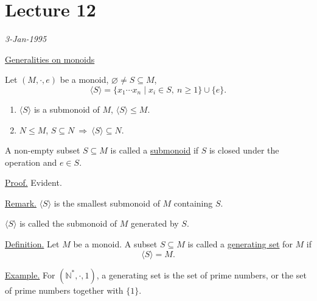 
\clearpage
\section{Lecture 12}

\begin{center}
\end{center}
\begin{flushright}
\textit{3-Jan-1995}
\end{flushright}

\medskip
\noindent\underline{Generalities on monoids}

\bigskip
\noindent{}\quad Let $(M,\cdot,e)$ be a monoid, $\varnothing\neq S\subseteq M$,
\[
\langle S\rangle
=\{x_1\cdots x_n\mid x_i\in S,\ n\geq 1\}\cup\{e\}.
\]
\noindent
\begin{enumerate}
\item[(1)] $\langle S\rangle$ is a submonoid of $M$, $\langle S\rangle\leq M$.
\item[(2)] $N\leq M$, $S\subseteq N\ \Longrightarrow\ \langle S\rangle\subseteq N$.
\end{enumerate}

\noindent A non-empty subset $S\subseteq M$ is called a \underline{submonoid}
if $S$ is closed under the operation and $e\in S$.

\bigskip
\noindent\underline{Proof.} Evident.

\bigskip
\noindent\underline{Remark.}\quad
$\langle S\rangle$ is the smallest submonoid of $M$ containing $S$.

\medskip
\noindent $\langle S\rangle$ is called the submonoid of $M$ generated by $S$.

\bigskip
\noindent\underline{Definition.}\quad
Let $M$ be a monoid. A subset $S\subseteq M$ is called a
\underline{generating set} for $M$ if
\[
\langle S\rangle=M.
\]

\bigskip
\noindent\underline{Example.}\quad
For $(\mathbb{N}^{*},\cdot,1)$, a generating set is the set of prime numbers,
or the set of prime numbers together with $\{1\}$.

